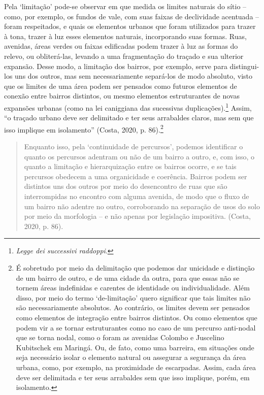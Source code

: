 \documentclass[12pt, a4paper]{book} %
\begin{document}
        Pela `limitação' pode-se observar em que medida os limites naturais do sítio – como, por exemplo, os fundos de vale, com suas faixas de declividade acentuada – foram respeitados, e quais os elementos urbanos que foram utilizados para trazer à tona, trazer à luz esses elementos naturais, incorporando suas formas. Ruas, avenidas, áreas verdes ou faixas edificadas podem trazer à luz as formas do relevo, ou obliterá-las, levando a uma fragmentação do traçado e sua ulterior expansão. Desse modo, a limitação dos bairros, por exemplo, serve para distingui-los uns dos outros, mas sem necessariamente separá-los de modo absoluto, visto que os limites de uma área podem ser pensados como futuros elementos de conexão entre bairros distintos, ou mesmo elementos estruturantes de novas expansões urbanas (como na lei caniggiana das sucessivas duplicações).\footnote[0]{\textit{Legge dei successivi raddoppi}.} Assim, ``o traçado urbano deve ser delimitado e ter seus arrabaldes claros, mas sem que isso implique em isolamento'' (Costa, 2020, p. 86).\footnote[104]{É sobretudo por meio da delimitação que podemos dar unicidade e distinção de um bairro de outro, e de uma cidade da outra, para que essas não se tornem áreas indefinidas e carentes de identidade ou individualidade. Além disso, por meio do termo ‘de-limitação’ quero significar que tais limites não são necessariamente absolutos. Ao contrário, os limites devem ser pensados como elementos de integração entre bairros distintos. Ou como elementos que podem vir a se tornar estruturantes como no caso de um percurso anti-nodal que se torna nodal, como o foram as avenidas Colombo e Juscelino Kubitschek em Maringá. Ou, de fato, como uma barreira, em situações onde seja necessário isolar o elemento natural ou assegurar a segurança da área urbana, como, por exemplo, na proximidade de escarpadas. Assim, cada área deve ser delimitada e ter seus arrabaldes sem que isso implique, porém, em isolamento.}

        \begin{quotation}
            Enquanto isso, pela ‘continuidade de percursos’, podemos identificar o quanto os percursos adentram ou não de um bairro a outro, e, com isso, o quanto a limitação e hierarquização entre os bairros ocorre, e se tais percursos obedecem a uma organicidade e coerência. Bairros podem ser distintos uns dos outros por meio do desencontro de ruas que são interrompidas no encontro com alguma avenida, de modo que o fluxo de um bairro não adentre no outro, corroborando na separação de usos do solo por meio da morfologia – e não apenas por legislação impositiva. (Costa, 2020, p. 86).
        \end{quotation}
\end{document}
